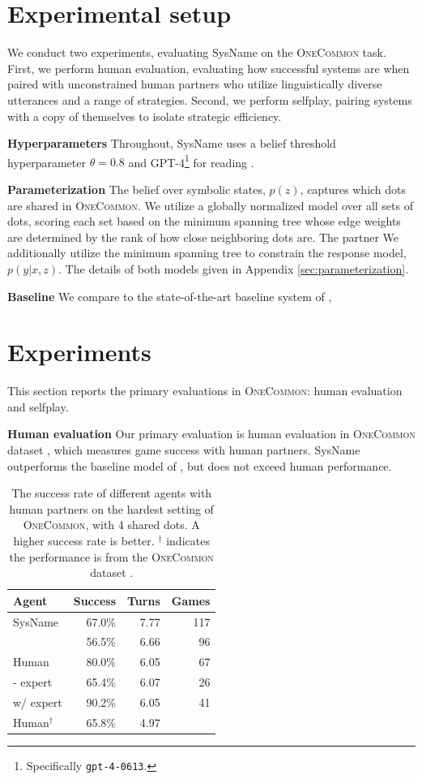 \documentclass[11pt]{article}
\newcommand{\system}{SysName}
\begin{document}
\section{Experimental setup}
We conduct two experiments,
evaluating \system{} on the \textsc{OneCommon} task.
First, we perform human evaluation, evaluating how successful systems are when paired with unconstrained human partners who utilize linguistically diverse utterances and a range of strategies.
Second, we perform selfplay, pairing systems with a copy of themselves to isolate strategic efficiency.

\textbf{Hyperparameters}
Throughout, \system{} uses a belief threshold hyperparameter $\theta = 0.8$
and GPT-4\footnote{Specifically \texttt{gpt-4-0613}.} for reading \citep{gpt4}.

\textbf{Parameterization}
The belief over symbolic states, $p(z)$,
captures which dots are shared in \textsc{OneCommon}.
We utilize a globally normalized model over all sets of dots,
scoring each set based on the minimum spanning tree
whose edge weights are determined by the rank of how close neighboring dots are.
The partner 
We additionally utilize the minimum spanning tree to constrain the response model, $p(y|x,z)$.
The details of both models given in Appendix \ref{sec:parameterization}.

\textbf{Baseline} We compare to the state-of-the-art baseline system of \citet{fried},

\section{Experiments}
This section reports the primary evaluations in \textsc{OneCommon}:
human evaluation and selfplay.

\textbf{Human evaluation}
Our primary evaluation is
human evaluation in \textsc{OneCommon} dataset \citep{onecommon},
which measures game success with human partners.
\system{} outperforms the baseline model of \citet{fried},
but does not exceed human performance.

\begin{table}[!t]
\centering
\begin{tabular}{lrrr}
\toprule
Agent                   & Success & Turns & Games\\
\midrule
\system{}               & 67.0\%  & 7.77 & 117\\
\citet{fried}           & 56.5\%  & 6.66 & 96\\
Human                   & 80.0\%  & 6.05 & 67\\
\quad - expert          & 65.4\%  & 6.07 & 26\\
\quad w/ expert         & 90.2\%  & 6.05 & 41\\
\hline
Human$^\dagger$         & 65.8\%  & 4.97\\
\bottomrule
\end{tabular}
\caption{\label{tbl:human-eval}
The success rate of different agents with human partners on the hardest setting of \textsc{OneCommon}, with 4 shared dots.
A higher success rate is better.
$^\dagger$ indicates the performance is from the \textsc{OneCommon} dataset
\citep{onecommon}.
}
\end{table}
\end{document}
